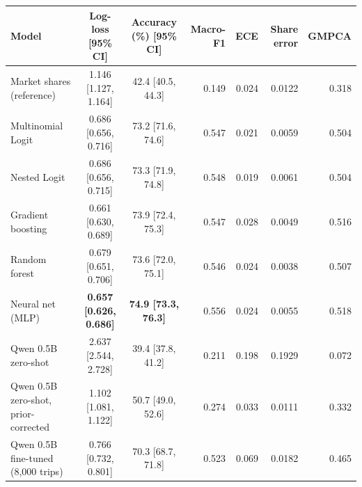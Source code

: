 \begin{tabular}{lccrrrr}
\toprule
Model & Log-loss [95\% CI] & Accuracy (\%) [95\% CI] & Macro-F1 & ECE & Share error & GMPCA \\
\midrule
Market shares (reference) & 1.146 [1.127, 1.164] & 42.4 [40.5, 44.3] & 0.149 & 0.024 & 0.0122 & 0.318 \\
\midrule
Multinomial Logit & 0.686 [0.656, 0.716] & 73.2 [71.6, 74.6] & 0.547 & 0.021 & 0.0059 & 0.504 \\
Nested Logit & 0.686 [0.656, 0.715] & 73.3 [71.9, 74.8] & 0.548 & 0.019 & 0.0061 & 0.504 \\
Gradient boosting & 0.661 [0.630, 0.689] & 73.9 [72.4, 75.3] & 0.547 & 0.028 & 0.0049 & 0.516 \\
Random forest & 0.679 [0.651, 0.706] & 73.6 [72.0, 75.1] & 0.546 & 0.024 & 0.0038 & 0.507 \\
Neural net (MLP) & \textbf{0.657 [0.626, 0.686]} & \textbf{74.9 [73.3, 76.3]} & 0.556 & 0.024 & 0.0055 & 0.518 \\
Qwen 0.5B zero-shot & 2.637 [2.544, 2.728] & 39.4 [37.8, 41.2] & 0.211 & 0.198 & 0.1929 & 0.072 \\
Qwen 0.5B zero-shot, prior-corrected & 1.102 [1.081, 1.122] & 50.7 [49.0, 52.6] & 0.274 & 0.033 & 0.0111 & 0.332 \\
Qwen 0.5B fine-tuned (8,000 trips) & 0.766 [0.732, 0.801] & 70.3 [68.7, 71.8] & 0.523 & 0.069 & 0.0182 & 0.465 \\
\bottomrule
\end{tabular}
